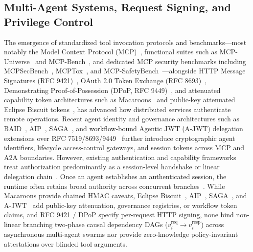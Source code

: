 \documentclass[conference,10pt]{IEEEtran}
\begin{document}
\subsection{Multi-Agent Systems, Request Signing, and Privilege Control}
The emergence of standardized tool invocation protocols and benchmarks---most notably the Model Context Protocol (MCP)~\cite{mcp2024spec}, functional suites such as MCP-Universe~\cite{luo2025mcpuniverse} and MCP-Bench~\cite{wang2025mcpbench}, and dedicated MCP security benchmarks including MCPSecBench~\cite{yang2025mcpsecbench}, MCPTox~\cite{wang2025mcptox}, and MCP-SafetyBench~\cite{zong2025mcpsafetybench}---alongside HTTP Message Signatures (RFC 9421)~\cite{backman2024rfc9421}, OAuth 2.0 Token Exchange (RFC 8693)~\cite{jones2020rfc8693}, Demonstrating Proof-of-Possession (DPoP, RFC 9449)~\cite{fett2023dpop}, and attenuated capability token architectures such as Macaroons~\cite{birgisson2014macaroons} and public-key attenuated Eclipse Biscuit tokens~\cite{couprie2025biscuit}, has advanced how distributed services authenticate remote operations. Recent agent identity and governance architectures such as BAID~\cite{lin2025baid}, AIP~\cite{prakash2026aip}, SAGA~\cite{syros2025saga}, and workflow-bound Agentic JWT (A-JWT) delegation extensions over RFC 7519/8693/9449~\cite{jones2015json, jones2020rfc8693, fett2023dpop, goswami2025ajwt} further introduce cryptographic agent identifiers, lifecycle access-control gateways, and session tokens across MCP and A2A boundaries. However, existing authentication and capability frameworks treat authorization predominantly as a session-level handshake or linear delegation chain~\cite{harding2012oauth}. Once an agent establishes an authenticated session, the runtime often retains broad authority across concurrent branches~\cite{saltzer1975protection, zhang2025asb}. While Macaroons provide chained HMAC caveats, Eclipse Biscuit~\cite{couprie2025biscuit}, AIP~\cite{prakash2026aip}, SAGA~\cite{syros2025saga}, and A-JWT~\cite{goswami2025ajwt} add public-key attenuation, governance registries, or workflow token claims, and RFC 9421 / DPoP specify per-request HTTP signing, none bind non-linear branching two-phase causal dependency DAGs ($v_i^{\text{req}} \to v_i^{\text{resp}}$) across asynchronous multi-agent swarms nor provide zero-knowledge policy-invariant attestations over blinded tool arguments.
\end{document}
